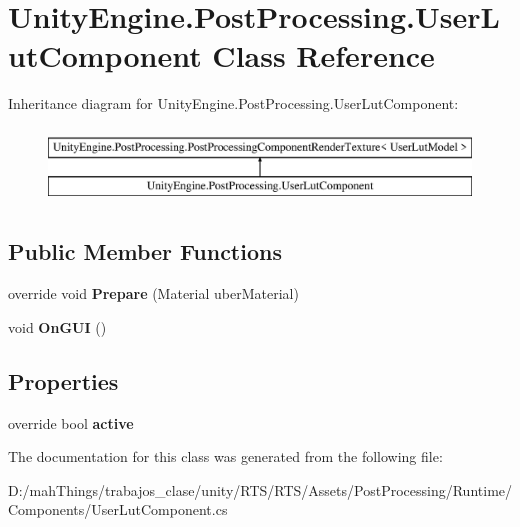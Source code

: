 \hypertarget{class_unity_engine_1_1_post_processing_1_1_user_lut_component}{}\section{Unity\+Engine.\+Post\+Processing.\+User\+Lut\+Component Class Reference}
\label{class_unity_engine_1_1_post_processing_1_1_user_lut_component}
Inheritance diagram for Unity\+Engine.\+Post\+Processing.\+User\+Lut\+Component\+:\begin{figure}[H]
\begin{center}
\leavevmode
\includegraphics[height=2.000000cm]{class_unity_engine_1_1_post_processing_1_1_user_lut_component}
\end{center}
\end{figure}
\subsection*{Public Member Functions}
\begin{DoxyCompactItemize}
\item 
\mbox{\label{class_unity_engine_1_1_post_processing_1_1_user_lut_component_a1d6e06b6268b29af5a7903889feeff4b}} 
override void {\bfseries Prepare} (Material uber\+Material)
\item 
\mbox{\label{class_unity_engine_1_1_post_processing_1_1_user_lut_component_ab7f0a943efb49620ee830296108b0b9c}} 
void {\bfseries On\+G\+UI} ()
\end{DoxyCompactItemize}
\subsection*{Properties}
\begin{DoxyCompactItemize}
\item 
\mbox{\label{class_unity_engine_1_1_post_processing_1_1_user_lut_component_a44cd6587c8dd47f373ec18f8e56edcd8}} 
override bool {\bfseries active}
\end{DoxyCompactItemize}


The documentation for this class was generated from the following file\+:\begin{DoxyCompactItemize}
\item 
D\+:/mah\+Things/trabajos\+\_\+clase/unity/\+R\+T\+S/\+R\+T\+S/\+Assets/\+Post\+Processing/\+Runtime/\+Components/User\+Lut\+Component.\+cs\end{DoxyCompactItemize}
